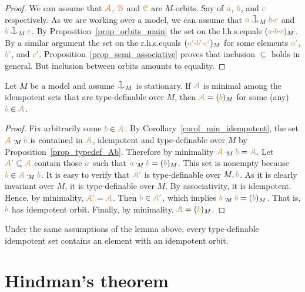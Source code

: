 \begin{proof}
We can assume that ${\color{brown}\EuScript A}$, ${\color{brown}\EuScript B}$ and ${\color{brown}\EuScript C}$ are $M$-orbits.
Say of ${\color{brown} a}$, ${\color{brown} b}$, and ${\color{brown} c}$ respectively.
As we are working over a model,
we can assume that ${\mr a}\cnonfork_M{\mr b}{\cdot}{\mr c}$ and ${\mr b}\cnonfork_M{\mr c}$.
By Proposition~\ref{prop_orbits_main} the set on the l.h.s.\@ equals $({\color{brown} a}{\cdot}{\color{brown} b}{\cdot}{\color{brown} c})_M$.
By a similar argument the set on the r.h.s.\@ equals $({\color{brown} a'}{\cdot}{\color{brown} b'}{\cdot}{\color{brown} c'})_M$ for some elements ${\color{brown} a'}$, ${\color{brown} b'}$, and ${\color{brown} c'}$.
Proposition~\ref{prop_semi_associative} proves that inclusion $\subseteq$ holds in general.
But inclusion between orbits amounts to equality.
\end{proof}

\begin{lemma}\label{lem_Hindman}
Let $M$ be a model and assume $\cnonfork_M$ is stationary.
If ${\color{brown}\EuScript A}$ is minimal among the
idempotent sets that are
type-definable over $M$, then ${\color{brown}\EuScript A}=({\color{brown} b})_M$ for some (any) ${\color{brown} b}\in{\color{brown}\EuScript A}$.
\end{lemma}

\begin{proof}
Fix arbitrarily some ${\color{brown} b}\in{\color{brown}\EuScript A}$.
%
By Corollary~\ref{corol_min_idempotent},
the set ${\color{brown}\EuScript A}\cdot_{\!M}{\color{brown} b}$ is contained in ${\color{brown}\EuScript A}$, idempotent and 
type-definable over $M$ by Proposition~\ref{prop_typedef_Ab}.
%
Therefore by minimality ${\color{brown}\EuScript A}\cdot_{\!M}{\color{brown} b}={\color{brown}\EuScript A}$.
%
Let ${\color{brown}\EuScript A'}\subseteq{\color{brown}\EuScript A}$ contain those ${\color{brown} a}$ such that 
${\color{brown} a}\cdot_{\!M}{\color{brown} b}=({\color{brown} b})_M$.
%
This set is nonempty because ${\color{brown} b}\in{\color{brown}\EuScript A}\cdot_{\!M}{\color{brown} b}$.
%
It is easy to verify that ${\color{brown}\EuScript A'}$ is type-definable over $M,{\color{brown} b}$.
%
As it is clearly invariant over $M$, it is type-definable over $M$.
%
By associativity, it is idempotent.
%
Hence, by minimality, ${\color{brown}\EuScript A'}={\color{brown}\EuScript A}$.
%
Then ${\color{brown} b}\in{\color{brown}\EuScript A'}$, which implies ${\color{brown} b}\cdot_{\!M}{\color{brown} b}=({\color{brown} b})_M$.
%
That is, ${\color{brown} b}$ has idempotent orbit.
%
Finally, by minimality, ${\color{brown}\EuScript A}=({\color{brown} b})_M$.
\end{proof}

\begin{corollary}\label{corol_idempotent}
Under the same assumptions of the lemma above, every type-definable 
idempotent set contains an element with an idempotent orbit.
\end{corollary}

\section{Hindman's theorem}\label{Hindman}

